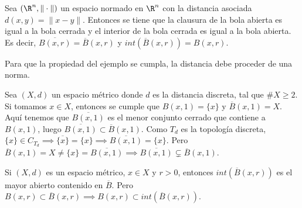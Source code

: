 \begin{exmp}
  Sea $(\R^n, \|\cdot\|)$ un espacio normado en $\R^n$ con la distancia asociada $d(x,y)=\|x-y\|$. Entonces se tiene que la clausura de la bola abierta es igual a la bola cerrada y el interior de la bola cerrada es igual a la bola abierta. Es decir, $\overline{B(x,r)}=\overline{B}(x,r)$ y $int(\overline{B}(x,r))=B(x,r)$.
\end{exmp}
Para que la propiedad del ejemplo se cumpla, la distancia debe proceder de una norma.
\begin{exmp}
  Sea $(X,d)$ un espacio métrico donde $d$ es la distancia discreta, tal que $\#X \ge 2$. Si tomamos $x \in X$, entonces se cumple que $B(x,1)=\{x\}$ y $\overline{B}(x,1)=X$. Aquí tenemos que $\overline{B(x,1)}$ es el menor conjunto cerrado que contiene a $B(x,1)$, luego $\overline{B(x,1)} \subset \overline{B}(x,1)$. Como $T_d$ es la topología discreta, $\{x\} \in C_{T_d} \implies \overline{\{x\}} = \{x\} \implies \overline{B(x,1)}=\{x\}$. Pero $\overline{B}(x,1)=X \neq \{x\} = \overline{B(x,1)} \implies \overline{B(x,1)} \subsetneq \overline{B}(x,1)$.
\end{exmp}
\begin{properties}
  Si $(X,d)$ es un espacio métrico, $x \in X$ y $r >0$, entonces $int(\overline{B}(x,r))$ es el mayor abierto contenido en $\overline{B}$. Pero $B(x,r) \subset \overline{B}(x,r) \implies B(x,r) \subset int(\overline{B}(x,r))$.
\end{properties}

